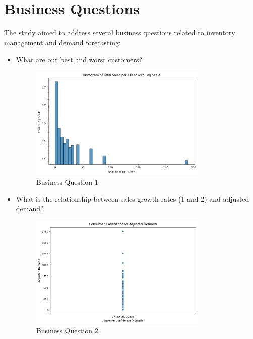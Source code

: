 \documentclass{article}
\begin{document}
\section{Business Questions}
The study aimed to address several business questions related to inventory management and demand forecasting:
\begin{itemize}
    \item What are our best and worst customers?
    
    \begin{figure}[H] 
        \begin{center}
        \centering
        \includegraphics[width=0.8\textwidth]{images/quest1.png}
        \caption{Business Question 1}
        \end{center}
    \end{figure} 

    \item What is the relationship between sales growth rates (1 and 2) and adjusted demand? 

    \begin{figure}[H] 
        \begin{center}
        \centering
        \includegraphics[width=0.8\textwidth]{images/quest2.png}
        \caption{Business Question 2}
        \end{center}
    \end{figure} 


\end{itemize}
\end{document}
